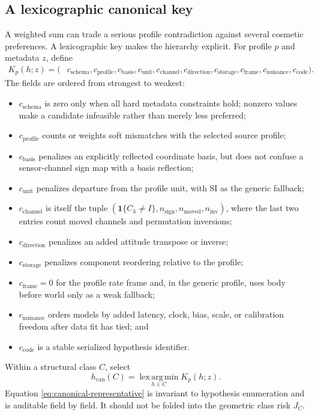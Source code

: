 \documentclass[11pt]{article}
\newcommand{\lexargmin}{\operatorname*{lex\,arg\,min}}
\begin{document}
    \subsection{A lexicographic canonical key}

    A weighted sum can trade a serious profile contradiction against several cosmetic
    preferences. A lexicographic key makes the hierarchy explicit. For profile $p$ and
    metadata $z$, define
    \begin{equation}
        \begin{split}
            K_p(h;z)=(&c_{\mathrm{schema}},c_{\mathrm{profile}},c_{\mathrm{basis}},
            c_{\mathrm{unit}},c_{\mathrm{channel}},c_{\mathrm{direction}},
            c_{\mathrm{storage}},c_{\mathrm{frame}},c_{\mathrm{nuisance}},
            c_{\mathrm{code}}).
            \label{eq:canonical-key}
        \end{split}
    \end{equation}
    The fields are ordered from strongest to weakest:
    \begin{itemize}[nosep]
    \item $c_{\mathrm{schema}}$ is zero only when all hard metadata constraints hold;
    nonzero values make a candidate infeasible rather than merely less preferred;
    \item $c_{\mathrm{profile}}$ counts or weights soft mismatches with the selected
    source profile;
    \item $c_{\mathrm{basis}}$ penalizes an explicitly reflected coordinate basis, but
    does not confuse a sensor-channel sign map with a basis reflection;
    \item $c_{\mathrm{unit}}$ penalizes departure from the profile unit, with SI as the
    generic fallback;
    \item $c_{\mathrm{channel}}$ is itself the tuple
    $(\mathbf 1\{C_h\ne I\},n_{\mathrm{sign}},n_{\mathrm{moved}},n_{\mathrm{inv}})$,
    where the last two entries count moved channels and permutation inversions;
    \item $c_{\mathrm{direction}}$ penalizes an added attitude transpose or inverse;
    \item $c_{\mathrm{storage}}$ penalizes component reordering relative to the profile;
    \item $c_{\mathrm{frame}}=0$ for the profile rate frame and, in the generic profile,
    uses body before world only as a weak fallback;
    \item $c_{\mathrm{nuisance}}$ orders models by added latency, clock, bias, scale, or
    calibration freedom after data fit has tied; and
    \item $c_{\mathrm{code}}$ is a stable serialized hypothesis identifier.
    \end{itemize}
    Within a structural class $C$, select
    \begin{equation}
        h_{\mathrm{can}}(C)
        =\lexargmin_{h\in C}K_p(h;z).
        \label{eq:canonical-representative}
    \end{equation}
    Equation \eqref{eq:canonical-representative} is invariant to hypothesis enumeration and
    is auditable field by field. It should not be folded into the geometric class risk $J_C$.
\end{document}
